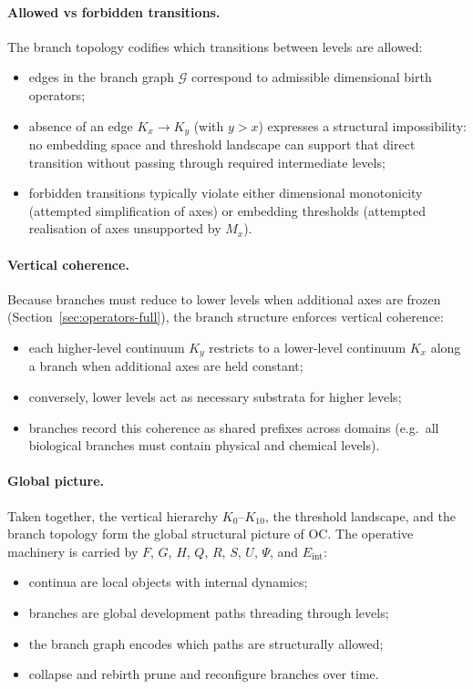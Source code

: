 \paragraph{Allowed vs forbidden transitions.}
The branch topology codifies which transitions between levels are allowed:
\begin{itemize}
  \item edges in the branch graph \(\mathcal{G}\) correspond to admissible
        dimensional birth operators;
  \item absence of an edge \(K_x \to K_y\) (with \(y>x\)) expresses a
        structural impossibility: no embedding space and threshold landscape
        can support that direct transition without passing through required
        intermediate levels;
  \item forbidden transitions typically violate either dimensional
        monotonicity (attempted simplification of axes) or embedding
        thresholds (attempted realisation of axes unsupported by \(M_x\)).
\end{itemize}

\paragraph{Vertical coherence.}
Because branches must reduce to lower levels when additional axes are frozen
(Section~\ref{sec:operators-full}), the branch structure enforces vertical
coherence:
\begin{itemize}
  \item each higher-level continuum \(K_y\) restricts to a lower-level
        continuum \(K_x\) along a branch when additional axes are held
        constant;
  \item conversely, lower levels act as necessary substrata for higher levels;
  \item branches record this coherence as shared prefixes across domains
        (e.g.\ all biological branches must contain physical and chemical
        levels).
\end{itemize}

\paragraph{Global picture.}
Taken together, the vertical hierarchy \(K_0\)–\(K_{10}\), the threshold
landscape, and the branch topology form the global structural picture of OC.
The operative machinery is carried by \(F\), \(G\), \(H\), \(Q\), \(R\),
\(S\), \(U\), \(\Psi\), and \(E_{\mathrm{int}}\):
\begin{itemize}
  \item continua are local objects with internal dynamics;
  \item branches are global development paths threading through levels;
  \item the branch graph encodes which paths are structurally allowed;
  \item collapse and rebirth prune and reconfigure branches over time.
\end{itemize}


